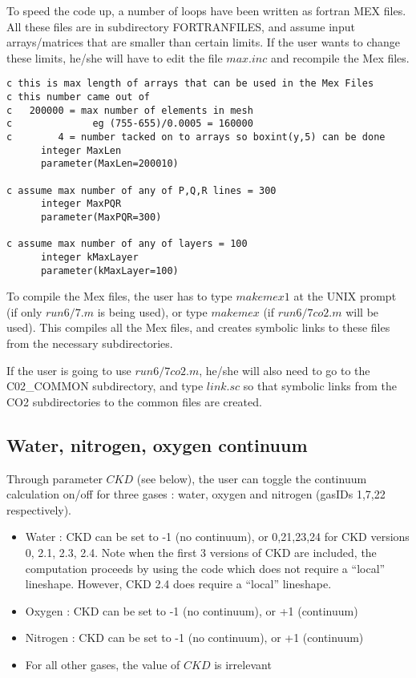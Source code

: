 \documentclass[11pt]{article}
\begin{document}
To speed the code up, a number of loops have been written as fortran MEX 
files. All these files are in subdirectory FORTRANFILES, and assume input 
arrays/matrices that are smaller than certain limits. If the user wants to 
change these limits, he/she will have to edit the file $max.inc$ and 
recompile the Mex files.

\begin{verbatim}
c this is max length of arrays that can be used in the Mex Files  
c this number came out of 
c   200000 = max number of elements in mesh 
c              eg (755-655)/0.0005 = 160000
c        4 = number tacked on to arrays so boxint(y,5) can be done  
      integer MaxLen
      parameter(MaxLen=200010)

c assume max number of any of P,Q,R lines = 300
      integer MaxPQR
      parameter(MaxPQR=300)

c assume max number of any of layers = 100
      integer kMaxLayer
      parameter(kMaxLayer=100)
\end{verbatim}

To compile the Mex files, the user has to type $makemex1$ at the UNIX 
prompt (if only $run6/7.m$ is being used), or type $makemex$ 
(if $run6/7co2.m$ will be used). This compiles all the Mex files, and creates 
symbolic links to these files from the necessary subdirectories.

If the user is going to use $run6/7co2.m$, he/she will also need to go to the 
C02\_COMMON subdirectory, and type $link.sc$ so that symbolic links from the
CO2 subdirectories to the common files are created.

\subsection{Water, nitrogen, oxygen continuum}
Through parameter $CKD$ (see below), the user can toggle the continuum 
calculation on/off for three gases : water, oxygen and nitrogen 
(gasIDs 1,7,22 respectively). 

\begin{itemize}
\item Water : CKD can be set to -1 (no continuum), or 0,21,23,24 for CKD 
              versions 0, 2.1, 2.3, 2.4. Note when the first 3 versions of CKD 
              are included, the computation proceeds by using the code which
              does not require a ``local'' lineshape. However, CKD 2.4 does
              require a ``local'' lineshape.
\item Oxygen : CKD can be set to -1 (no continuum), or +1 (continuum)
\item Nitrogen : CKD can be set to -1 (no continuum), or +1 (continuum)
\item For all other gases, the value of $CKD$ is irrelevant
\end{itemize}
\end{document}
